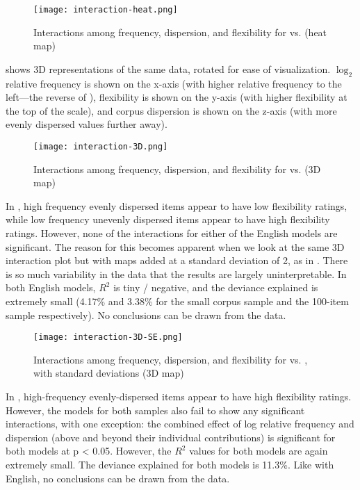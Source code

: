 \begin{figure}
  \centering
  \caption{Interactions among frequency, dispersion, and flexibility for  vs.  (heat map)}
  \label{fig:interaction-heat}
  \texttt{[image: interaction-heat.png]}
\end{figure}

 shows 3D representations of the same data, rotated for ease of visualization. $\log_2$ relative frequency is shown on the x-axis (with higher relative frequency to the left—the reverse of ), flexibility is shown on the y-axis (with higher flexibility at the top of the scale), and corpus dispersion is shown on the z-axis (with more evenly dispersed values further away).

\begin{figure}
  \centering
  \caption{Interactions among frequency, dispersion, and flexibility for  vs.  (3D map)}
  \label{fig:interaction-3D}
  \texttt{[image: interaction-3D.png]}
\end{figure}

In , high frequency evenly dispersed items appear to have low flexibility ratings, while low frequency unevenly dispersed items appear to have high flexibility ratings. However, none of the interactions for either of the English models are significant. The reason for this becomes apparent when we look at the same 3D interaction plot but with maps added at a standard deviation of 2, as in . There is so much variability in the data that the results are largely uninterpretable. In both English models, $R^2$ is tiny / negative, and the deviance explained is extremely small (4.17\% and 3.38\% for the small corpus sample and the 100-item sample respectively). No conclusions can be drawn from the data.

\begin{figure}
  \centering
  \caption{Interactions among frequency, dispersion, and flexibility for  vs. , with standard deviations (3D map)}
  \label{fig:interaction-3D-SD}
  \texttt{[image: interaction-3D-SE.png]}
\end{figure}

In , high-frequency evenly-dispersed items appear to have high flexibility ratings. However, the models for both  samples also fail to show any significant interactions, with one exception: the combined effect of log relative frequency and dispersion (above and beyond their individual contributions) is significant for both models at p < 0.05. However, the $R^2$ values for both models are again extremely small. The deviance explained for both models is 11.3\%. Like with English, no conclusions can be drawn from the data.

